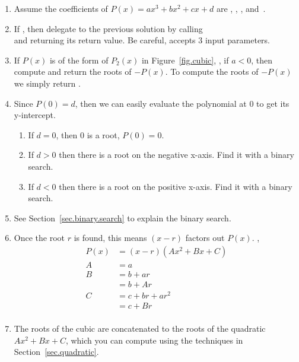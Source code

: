 \begin{enumerate}
\item Assume the coefficients of $P(x) = a x^3 + b x^2 + c x + d$ are
  ,  ,  ,  and~.
\item If , then delegate to the previous solution by
  calling \\
   and returning its return
  value.  Be careful,  accepts 3 input
  parameters.
\item If $P(x)$ is of the form of $P_2(x)$ in Figure~\ref{fig.cubic},
  \ie, if $a<0$, then compute and return the roots of $-P(x)$.  To
  compute the roots of $-P(x)$ we simply return
  .
\item Since $P(0) = d$, then we can easily evaluate the polynomial at 0 to get its y-intercept.
  \begin{enumerate}
  \item If $d = 0$, then 0 is a root, $P(0) = 0$.
  \item If $d>0$ then there is a root on the negative x-axis.  Find it with a binary search.
  \item If $d<0$ then there is a root on the positive x-axis. Find it with a binary search.
  \end{enumerate}
\item See Section~\ref{sec.binary.search} to explain the binary search.
\item Once the root $r$ is found, this means $(x-r)$ factors out $P(x)$. \Ie,
  \begin{align*}
    P(x) &= (x-r)(A x^2 + B x + C)\\ 
    A &= a\\
    B &= b + a r \\
    &= b + A r\\
    C &= c + b r + a r^2 \\
    &=
    c + B r\\
  \end{align*}
\item The roots of the cubic are \code{[r]} concatenated to the roots of the quadratic 
  $A x^2 + B x + C$, which you can compute using the techniques in Section~\ref{sec.quadratic}.
\end{enumerate}

